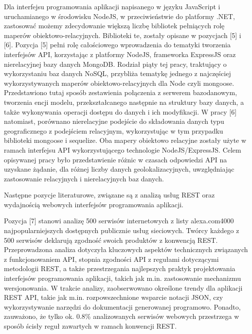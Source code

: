 Dla interfejsu programowania aplikacji napisanego w języku JavaScript i uruchamianego w środowisku NodeJS, w przeciwieństwie do platformy .NET, zastosować możemy zdecydowanie większą liczbę bibliotek pełniących rolę maperów obiektowo-relacyjnych. Biblioteki te, zostały opisane w pozycjach [5] i [6]. Pozycja [5] pełni rolę całościowego wprowadzenia do tematyki tworzenia interfejsów API, korzystając z platformy NodeJS, frameworka ExpressJS oraz nierelacyjnej bazy danych MongoDB. Rodział piąty tej pracy, traktujący o wykorzystaniu baz danych NoSQL, przybliża tematykę jednego z najczęściej wykorzystywanych maperów obiektowo-relacyjnych dla Node czyli mongoose. Przedstawiono tutaj sposób zestawienia połączenia z serwerem bazodanowym, tworzenia encji modelu, przekształcanego następnie na struktury bazy danych, a także wykonywania operacji dostępu do danych i ich modyfikacji. W pracy [6] natomiast, porównano nierelacyjne podejście do składowania danych typu geograficznego z podejściem relacyjnym, wykorzystując w tym przypadku biblioteki mongoose i sequelize. Oba mapery obiektowo relacyjne zostały użyte w ramach interfejsu API wykorzystującego technologie NodeJS/ExpressJS. Celem opisywanej pracy było przedstawienie różnic w czasach odpowiedzi API na uzyskane żądanie, dla różnej liczby danych geolokalizacyjnych, uwzględniając zastosowanie relacyjnych i nierelacyjnych baz danych.

Następne pozycje literaturowe, związane są z analizą usług REST oraz wydajnością webowych interfejsów programowania aplikacji.

Pozycja [7] stanowi analizę 500 serwisów internetowych z listy alexa.com4000 najpopularniejszych dostępnych publicznie usług sieciowych. Twórcy każdego z 500 serwisów deklarują zgodność swoich produktów z konwencją REST. Przeprowadzona analiza dotyczyła kluczowych aspektów technicznych związanych z funkcjonowaniem API, stopnia zgodności API z regułami dotyczącymi metodologii REST, a także przestrzegania najlepszych praktyk projektowania interfejsów programowania aplikacji, takich jak m.in. zastosowanie mechanizmu wersjonowania. W trakcie analizy, zaobserwowano określone trendy dla aplikacji REST API, takie jak m.in. rozpowszechnione wsparcie notacji JSON, czy wykorzystywanie narzędzi do dokumentacji generowanej programowo. Ponadto, zauważono, że tylko ok. 0.8\% analizowanych serwisów webowych przestrzega w sposób ścisły reguł zawartych w ramach konwencji REST.

